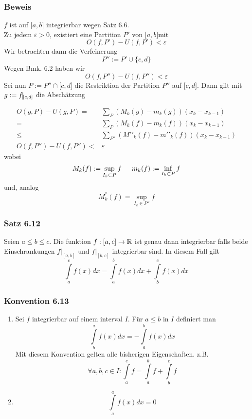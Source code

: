 \subsubsection*{Beweis}
$f$ ist auf $\lbrack a,b\rbrack$ integrierbar wegen Satz 6.6.\\
Zu jedem $\varepsilon>0$, existiert eine Partition $P'$ von $\lbrack a,b\rbrack$mit \[O(f,P')-U(f,P')<\varepsilon\]
Wir betrachten dann die Verfeinerung \[P'':=P'\cup\{ c,d\}\]
Wegen Bmk. 6.2 haben wir \[O(f,P'')-U(f,P'')<\varepsilon\]
Sei nun $P:=P''\cap \lbrack c,d\rbrack$ die Restriktion der Partition $P''$ auf $\lbrack c,d\rbrack$. Dann gilt mit $g:=f\vline _{\left[ c,d\right] }$ die Abschätzung

\begin{align*}
O(g,P) - U(g,P) =&\sum\limits_P {({M_k}(g) - {m_k}(g))({x_k} - {x_{k - 1}})} \\
=&\sum\limits_P {({M_k}(f) - {m_k}(f))({x_k} - {x_{k - 1}})} \\
\le&\sum\limits_{P''} {(M'{'_k}(f) - m'{'_k}(f))({x_k} - {x_{k - 1}})} \\
O(f,P'')-U(f,P'')<& \varepsilon
\end{align*}
wobei
\[{M_k}(f): = \mathop {\sup }\limits_{{I_k} \subset P} f\text{\indent}{m_k}(f): = \mathop {\inf }\limits_{{I_k} \subset P} f\]
und, analog
\[M^{''}_{k}\left( f\right) =\sup _{I_k\in P''}f\]

\subsubsection*{Satz 6.12}
Seien $a\leq b\leq c$. Die funktion $f:\lbrack a,c\rbrack\to\mathbb{R}$ ist genau dann integrierbar falls beide Einschrankungen ${\left. f \right|_{[a,b]}}$ und ${\left. f \right|_{[b,c]}}$ integrierbar sind. In diesem Fall gilt \[\int\limits_a^c {f(x)dx = \int\limits_a^b {f(x)dx + \int\limits_b^c {f(x)dx} } } \]
\subsubsection*{Konvention 6.13}
\begin{enumerate}[\indent 1)]
\item Sei $f$ integrierbar auf einem interval $I$. Für $a\leq b$ in $I$ definiert man \[\int\limits_b^a {f(x)dx =  - \int\limits_a^b {f(x)dx} } \]
Mit diesem Konvention gelten alle bisherigen Eigenschaften. z.B. \[\forall a,b,c \in I:\int\limits_a^c f  = \int\limits_a^b f  + \int\limits_b^c f \]
\item \[\int\limits_a^a {f(x)dx = 0} \]
\end{enumerate}
